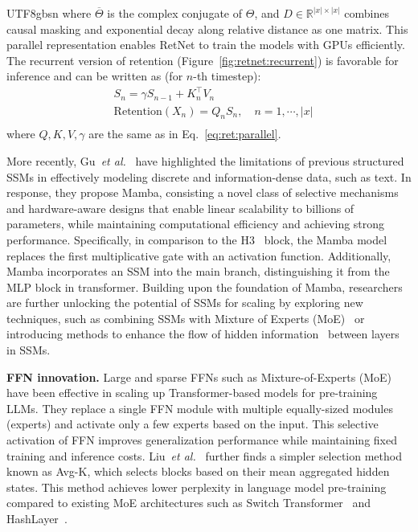 \documentclass[10pt,journal,compsoc]{IEEEtran}
\newcommand{\etal}{\emph{et al.}}
\newcommand{\<}{\left\langle}
\renewcommand{\>}{\right\rangle}
\newcommand{\1}{\mathbbm{1}}
\begin{document}
\begin{CJK}{UTF8}{gbsn}
where $\overline{\Theta}$ is the complex conjugate of $\Theta$, and $D \in \mathbb{R}^{|x|\times |x|}$ combines causal masking and exponential decay along relative distance as one matrix.
This parallel representation enables RetNet to train the models with GPUs efficiently.
The recurrent version of retention (Figure~\ref{fig:retnet:recurrent}) is favorable for inference and can be written as (for $n$-th timestep):
\begin{equation}
	\begin{aligned}
		\label{eq:ret:recurrent}
		&S_n = \gamma S_{n-1} + K_n^{\intercal} V_n \\
		&\mathrm{Rete}\mathrm{ntion} (X_n) = Q_n S_n, \quad n = 1, \cdots, |x| \\
	\end{aligned}
\end{equation}
where $Q,K,V,\gamma$ are the same as in Eq.~\ref{eq:ret:parallel}.

More recently, Gu~\etal~\cite{gu2023mamba} have highlighted the limitations of previous structured SSMs in effectively modeling discrete and information-dense data, such as text. In response, they propose Mamba, consisting a novel class of selective mechanisms and hardware-aware designs that enable linear scalability to billions of parameters, while maintaining computational efficiency and achieving strong performance. Specifically, in comparison to the H3~\cite{dao2022hungry} block, the Mamba model replaces the first multiplicative gate with an activation function. Additionally, Mamba incorporates an SSM into the main branch, distinguishing it from the MLP block in transformer. Building upon the foundation of Mamba, researchers are further unlocking the potential of SSMs for scaling by exploring new techniques, such as combining SSMs with Mixture of Experts (MoE)~\cite{pioro2024moe} or introducing methods to enhance the flow of hidden information~\cite{he2024densemamba} between layers in SSMs.

\noindent\textbf{FFN innovation.}
Large and sparse FFNs such as Mixture-of-Experts (MoE)~\cite{du2022glam,lepikhin2020gshard,fedus2022switch,roller2021hash,chi2022representation,lewis2021base} have been effective in scaling up Transformer-based models for pre-training LLMs. They replace a single FFN module with multiple equally-sized modules (experts) and activate only a few experts based on the input. This selective activation of FFN improves generalization performance while maintaining fixed training and inference costs.
Liu~\etal~\cite{liu2023towards} further finds a simpler selection method known as Avg-K, which selects blocks based on their mean aggregated hidden states. This method achieves lower perplexity in language model pre-training compared to existing MoE architectures such as Switch Transformer~\cite{fedus2022switch} and HashLayer~\cite{roller2021hash}.


\end{CJK}
\end{document}
